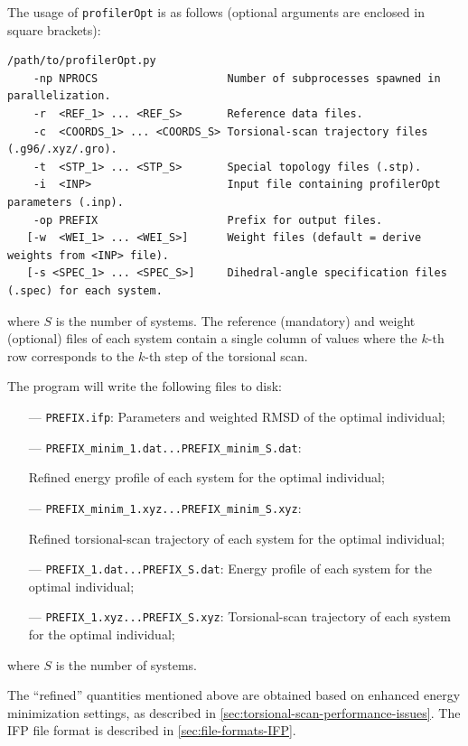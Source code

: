\documentclass[10pt,a4paper,openany]{memoir}
\numberwithin{equation}{section}
\newcommand{\profileropt}[0]{\texttt{profilerOpt}}
\begin{document}
The usage of \profileropt{} is as follows (optional arguments are
enclosed in square brackets):

\begin{lstlisting}
/path/to/profilerOpt.py
    -np NPROCS                    Number of subprocesses spawned in parallelization.
    -r  <REF_1> ... <REF_S>       Reference data files.
    -c  <COORDS_1> ... <COORDS_S> Torsional-scan trajectory files (.g96/.xyz/.gro).
    -t  <STP_1> ... <STP_S>       Special topology files (.stp).
    -i  <INP>                     Input file containing profilerOpt parameters (.inp).
    -op PREFIX                    Prefix for output files.
   [-w  <WEI_1> ... <WEI_S>]      Weight files (default = derive weights from <INP> file).
   [-s <SPEC_1> ... <SPEC_S>]     Dihedral-angle specification files (.spec) for each system.
\end{lstlisting}\vspace{1ex}

\noindent where $S$ is the number of systems.
The reference (mandatory) and weight (optional) files of each system contain a single column
of values where the $k$-th row corresponds to the $k$-th step of the
torsional scan.

The program will write the following files to disk:
\begin{itemize}
\item [---]\texttt{PREFIX.ifp}: Parameters and weighted RMSD of the optimal individual;
\item[---] \texttt{PREFIX\_minim\_1.dat...PREFIX\_minim\_S.dat}: \par Refined energy profile of each system for the optimal individual;
\item[---] \texttt{PREFIX\_minim\_1.xyz...PREFIX\_minim\_S.xyz}: \par Refined torsional-scan trajectory of each system for the optimal individual;
\item[---] \texttt{PREFIX\_1.dat...PREFIX\_S.dat}: Energy profile of each system for the optimal individual;
\item[---] \texttt{PREFIX\_1.xyz...PREFIX\_S.xyz}: Torsional-scan trajectory of each system for the optimal individual;
\end{itemize}
where $S$ is the number of systems.

The ``refined'' quantities mentioned above are obtained based on enhanced energy
minimization settings, as described in
\autoref{sec:torsional-scan-performance-issues}.  The IFP file format is
described in \autoref{sec:file-formats-IFP}.
\end{document}
